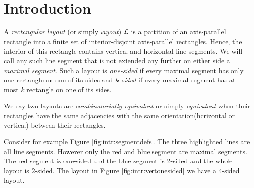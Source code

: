 
\section{Introduction}
\thispagestyle{plain}

  A  \emph{rectangular layout} (or simply \emph{layout}) $\mathcal{L}$ is a partition of an axis-parallel rectangle into a finite set of interior-disjoint axis-parallel rectangles. Hence, the interior of this rectangle contains vertical and horizontal line segments. We will call any such line segment that is not extended any further on either side a \emph{maximal segment}. Such a layout is \emph{one-sided} if every maximal segment has only one rectangle on one of its sides and \emph{$k$-sided} if every maximal segment has at most $k$ rectangle on one of its sides.

  We say two layouts are  \emph{combinatorially equivalent} or simply \emph{equivalent} when their rectangles have the same adjacencies with the same orientation(horizontal or vertical) between their rectangles.

  Consider for example Figure \ref{fig:intr:segmentdefs}. The three highlighted lines are all line segments. However only the red and blue segment are maximal segments. The red segment is one-sided and the blue segment is $2$-sided and the whole layout is $2$-sided. The layout in Figure \ref{fig:intr:vertonesided} we have a $4$-sided layout.

